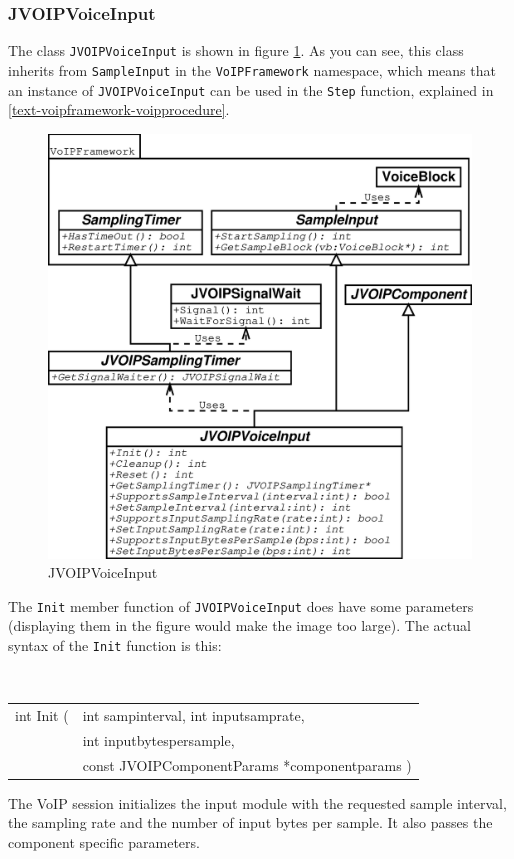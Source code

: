 			\subsubsection{JVOIPVoiceInput}
			
			The class {\tt JVOIPVoiceInput} is shown in figure \ref{class-jvoipvoiceinput}. As
			you can see, this class inherits from {\tt SampleInput} in the {\tt VoIPFramework}
			namespace, which means that an instance of {\tt JVOIPVoiceInput} can be used in
			the {\tt Step} function, explained in \ref{text-voipframework-voipprocedure}.
			\begin{figure}
				\center
				\includegraphics[width=0.9\linewidth]{images/manual/chapter2/class-jvoipvoiceinput.eps}
				\caption{JVOIPVoiceInput}
				\label{class-jvoipvoiceinput}
			\end{figure}
			
			The {\tt Init} member function of {\tt JVOIPVoiceInput} does have some parameters
			(displaying them in the figure would make the image too large). The actual syntax
			of the {\tt Init} function is this:
			\begin{center}
				{\tt
				\begin{tabular}{rl}
					int Init (&int sampinterval, int inputsamprate, \\
					&int inputbytespersample,\\
					&const JVOIPComponentParams *componentparams )\\
				\end{tabular}
				}
			\end{center}
			The VoIP session initializes the input module with the requested sample interval,
			the sampling rate and the number of input bytes per sample. It also passes the
			component specific parameters.
			
